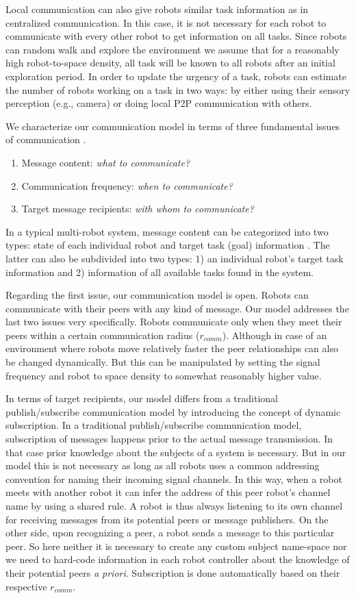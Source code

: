 Local communication can also give robots similar task information as in centralized communication. In this case, it is not necessary for each robot to communicate with every other robot to get information on all tasks. Since robots can random walk and explore the environment we assume that for a reasonably high robot-to-space density, all task will be known to all robots after an initial exploration period. In order to update the urgency of a task, robots can estimate the number of robots working on a task in two ways:  by either using their sensory perception (e.g., camera) or  doing local P2P communication with others.

We characterize our communication model in terms of three fundamental issues of communication \cite{Gerkey+2001}. 
\begin{enumerate}
\item Message content: {\em what to communicate?}
\item Communication frequency: {\em when to communicate?}
\item Target message recipients: {\em with whom to communicate?}
\end{enumerate}
In a typical multi-robot system, message content can be categorized into two types: state of each individual robot and target task (goal) information \cite{Balch2005}. The latter can also be subdivided into two types: 1) an individual robot's target task information and 2) information of all available tasks found in the system.

Regarding the first issue, our communication model is open. Robots can communicate with their peers with any kind of message. Our model addresses the last two issues very specifically. Robots communicate only when they meet their peers within a certain communication radius ($r_{comm}$). Although in case of an environment where robots move relatively faster the peer relationships can also be changed dynamically. But this can be manipulated by setting the signal frequency and robot to space density to somewhat reasonably higher value.

In terms of target recipients, our model differs from a traditional publish/subscribe communication model by introducing the concept of dynamic subscription. In a traditional publish/subscribe communication model, subscription of messages happens prior to the actual message transmission. In that case prior knowledge about the subjects of a system is necessary. But in our model this is not necessary as long as all robots uses a common addressing convention for naming their incoming signal channels. In this way, when a robot meets with another robot it can infer the address of this peer robot's channel name by using a shared rule. A robot is thus always listening to its own channel for receiving messages from its potential peers or message publishers. On the other side, upon recognizing a peer, a robot sends a message to this particular peer. So here neither it is necessary to create any custom subject name-space  \cite{Gerkey+2001} nor we need to hard-code information in each robot controller about the knowledge of their potential peers {\em a priori}. Subscription is done automatically based on their respective $r_{comm}$.
%

